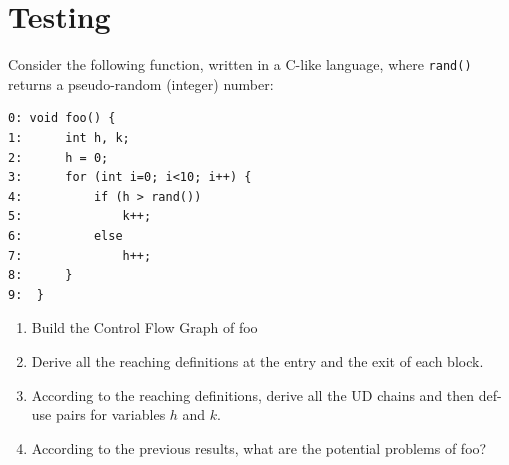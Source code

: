 \section{Testing}

Consider the following function, written in a C-like language, where \texttt{rand()} returns a pseudo-random (integer) number:
\begin{lstlisting}[style=C]
0: void foo() {
1:      int h, k;
2:      h = 0; 
3:      for (int i=0; i<10; i++) {
4:          if (h > rand()) 
5:              k++;
6:          else
7:              h++;
8:      } 
9:  }
\end{lstlisting}
\begin{enumerate}
    \item Build the Control Flow Graph of foo
    \item Derive all the reaching definitions at the entry and the exit of each block.
    \item According to the reaching definitions, derive all the UD chains and then def-use pairs for variables $h$ and $k$.
    \item According to the previous results, what are the potential problems of foo?
\end{enumerate}

